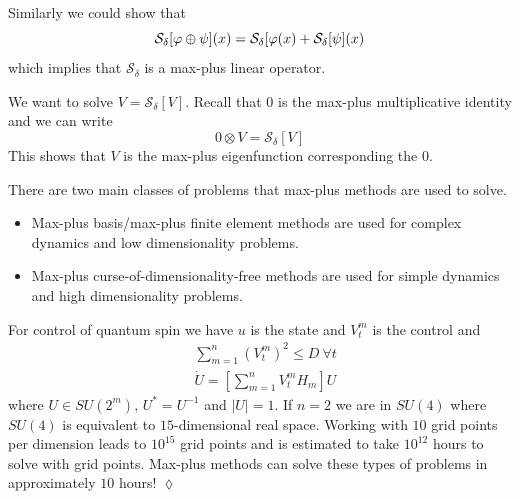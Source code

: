 Similarly we could show that
$$\mathcal{S}_\delta[\varphi\oplus\psi](x) = \mathcal{S}_\delta[\varphi(x) + \mathcal{S}_\delta[\psi](x)$$
which implies that $\mathcal{S}_\delta$ is a max-plus linear operator.

We want to solve $V=\mathcal{S}_\delta[V]$.
Recall that $0$ is the max-plus multiplicative identity and we can write
$$0\otimes V=\mathcal{S}_\delta[V]$$
This shows that $V$ is the max-plus eigenfunction corresponding the $0$.

There are two main classes of problems that max-plus methods are used to solve.
\begin{itemize}
\item Max-plus basis/max-plus finite element methods are used for complex dynamics and low dimensionality problems.
\item Max-plus curse-of-dimensionality-free methods are used for simple dynamics and high dimensionality problems.
\end{itemize}

\begin{example}
For control of quantum spin we have $u$ is the state and $V_t^m$ is the control and
\begin{align*}
&\sum_{m=1}^n{(V_t^m)}^2\leq D~\forall t \\
&\dot{U} = \left[\sum_{m=1}^n V_t^m H_m\right]U
\end{align*}
where $U\in SU(2^m)$, $U^\ast=U^{-1}$ and $|U|=1$.
If $n=2$ we are in $SU(4)$ where $SU(4)$ is equivalent to $15$-dimensional real space.
Working with $10$ grid points per dimension leads to $10^{15}$ grid points and is estimated to take $10^{12}$ hours to solve with grid points.
Max-plus methods can solve these types of problems in approximately $10$ hours!
$\lozenge$
\end{example}%
